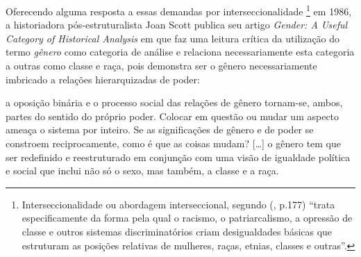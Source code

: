 
Oferecendo alguma resposta a essas demandas por interseccionalidade%
\footnote{Interseccionalidade ou abordagem interseccional, segundo  (\citeyear{CRENSHAW2002}, p.177) ``trata especificamente da forma pela qual o racismo, o patriarcalismo, a opressão de classe e outros sistemas discriminatórios criam desigualdades básicas que estruturam as posições relativas de mulheres, raças, etnias, classes e outras''.} em 1986, a historiadora pós-estruturalista Joan Scott publica seu artigo \emph{Gender: A Useful Category of Historical Analysis} em que faz uma leitura crítica da utilização do termo \emph{gênero} como categoria de análise e relaciona necessariamente esta categoria a outras como classe e raça, pois demonstra ser o gênero necessariamente imbricado a relações hierarquizadas de poder:

\begin{citacao}
a oposição binária e o processo social das relações de gênero tornam-se,
ambos, partes do sentido do próprio poder. Colocar em questão ou mudar um aspecto ameaça o sistema por inteiro. Se as significações de gênero e de poder se constroem reciprocamente, como é que as coisas mudam? [\ldots] o gênero tem que ser redefinido e reestruturado em conjunção com uma visão de igualdade política e social que inclui não só o sexo, mas também, a classe e a raça. \cite[p.1073,1075]{SCOTT1986}
\end{citacao}


